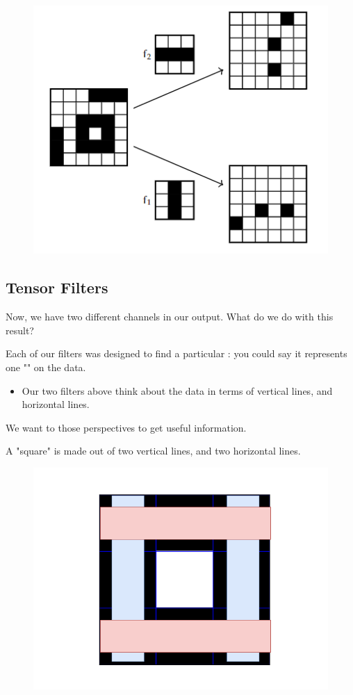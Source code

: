         \begin{figure}[ht]
            \centering
            \includegraphics[width=.5\linewidth]{images/convolutional_neural_networks_images/two_channels.png}
        \end{figure}

    \pagebreak

    \subsection{Tensor Filters}

        Now, we have two different channels in our output. What do we do with this result?

        Each of our filters was designed to find a particular : you could say it represents one "" on the data.

        \begin{itemize}
            \item Our two filters above think about the data in terms of vertical lines, and horizontal lines.
        \end{itemize}

        We want to  those perspectives to get useful information. 

        \miniex A "square" is made out of two vertical lines, and two horizontal lines.

        \begin{figure}[H]
            \centering
            \includegraphics[width=.3\linewidth]{images/convolutional_neural_networks_images/square_marked.png}
        \end{figure}

